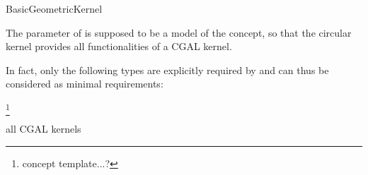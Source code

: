 \begin{ccRefConcept}{BasicGeometricKernel} 

\ccDefinition

The  parameter of  is
supposed to be a model of the  concept, so that the
circular kernel provides all functionalities of a CGAL kernel.  

\ccTypes

In fact, only the following types are explicitly required by
 and can thus be considered as minimal requirements:

 \footnote{concept template...?}


\ccHasModels

all CGAL kernels

\ccSeeAlso


\end{ccRefConcept}
